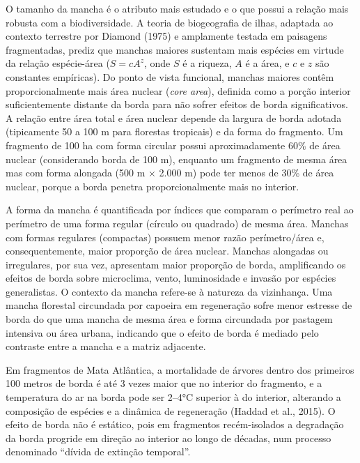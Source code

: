 \documentclass[
  portuguese,
  11pt,
  a4paper,
  open=any]{scrbook}
\begin{document}
O tamanho da mancha é o atributo mais estudado e o que possui a relação
mais robusta com a biodiversidade. A teoria de biogeografia de ilhas,
adaptada ao contexto terrestre por Diamond (1975) e amplamente testada
em paisagens fragmentadas, prediz que manchas maiores sustentam mais
espécies em virtude da relação espécie-área (\(S = cA^z\), onde \(S\) é
a riqueza, \(A\) é a área, e \(c\) e \(z\) são constantes empíricas). Do
ponto de vista funcional, manchas maiores contêm proporcionalmente mais
área nuclear (\emph{core area}), definida como a porção interior
suficientemente distante da borda para não sofrer efeitos de borda
significativos. A relação entre área total e área nuclear depende da
largura de borda adotada (tipicamente 50 a 100 m para florestas
tropicais) e da forma do fragmento. Um fragmento de 100 ha com forma
circular possui aproximadamente 60\% de área nuclear (considerando borda
de 100 m), enquanto um fragmento de mesma área mas com forma alongada
(500 m × 2.000 m) pode ter menos de 30\% de área nuclear, porque a borda
penetra proporcionalmente mais no interior.

A forma da mancha é quantificada por índices que comparam o perímetro
real ao perímetro de uma forma regular (círculo ou quadrado) de mesma
área. Manchas com formas regulares (compactas) possuem menor razão
perímetro/área e, consequentemente, maior proporção de área nuclear.
Manchas alongadas ou irregulares, por sua vez, apresentam maior
proporção de borda, amplificando os efeitos de borda sobre microclima,
vento, luminosidade e invasão por espécies generalistas. O contexto da
mancha refere-se à natureza da vizinhança. Uma mancha florestal
circundada por capoeira em regeneração sofre menor estresse de borda do
que uma mancha de mesma área e forma circundada por pastagem intensiva
ou área urbana, indicando que o efeito de borda é mediado pelo contraste
entre a mancha e a matriz adjacente.

\begin{tcolorbox}[enhanced jigsaw, colbacktitle=quarto-callout-note-color!10!white, coltitle=black, opacityback=0, breakable, left=2mm, colback=white, bottomtitle=1mm, toptitle=1mm, titlerule=0mm, arc=.35mm, opacitybacktitle=0.6, leftrule=.75mm, colframe=quarto-callout-note-color-frame, title=\textcolor{quarto-callout-note-color}{\faInfo}\hspace{0.5em}{Efeito de borda em florestas tropicais}, rightrule=.15mm, bottomrule=.15mm, toprule=.15mm]

Em fragmentos de Mata Atlântica, a mortalidade de árvores dentro dos
primeiros 100 metros de borda é até 3 vezes maior que no interior do
fragmento, e a temperatura do ar na borda pode ser 2--4°C superior à do
interior, alterando a composição de espécies e a dinâmica de regeneração
(Haddad et al., 2015). O efeito de borda não é estático, pois em
fragmentos recém-isolados a degradação da borda progride em direção ao
interior ao longo de décadas, num processo denominado ``dívida de
extinção temporal''.

\end{tcolorbox}
\end{document}
